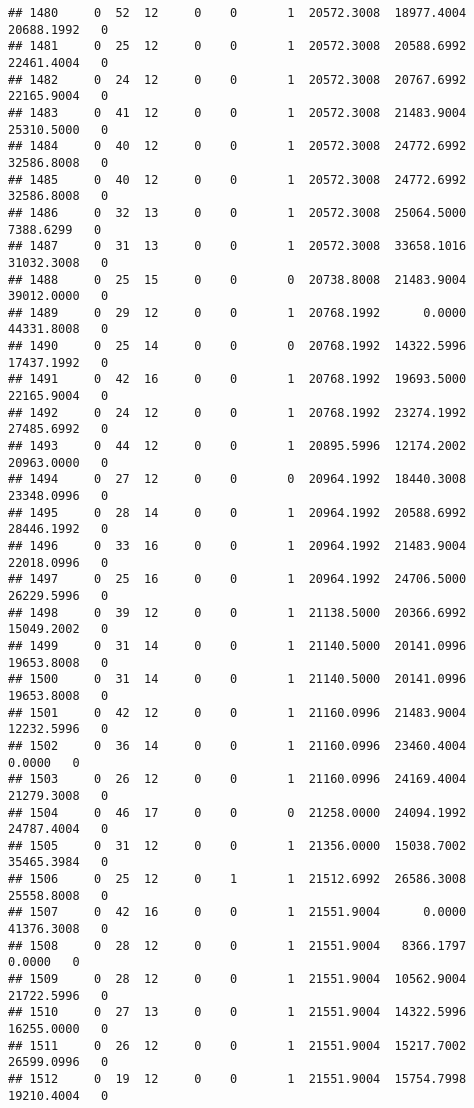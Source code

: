 \documentclass[
]{article}
\begin{document}
\begin{enumerate}
\begin{verbatim}
## 1480     0  52  12     0    0       1  20572.3008  18977.4004  20688.1992   0
## 1481     0  25  12     0    0       1  20572.3008  20588.6992  22461.4004   0
## 1482     0  24  12     0    0       1  20572.3008  20767.6992  22165.9004   0
## 1483     0  41  12     0    0       1  20572.3008  21483.9004  25310.5000   0
## 1484     0  40  12     0    0       1  20572.3008  24772.6992  32586.8008   0
## 1485     0  40  12     0    0       1  20572.3008  24772.6992  32586.8008   0
## 1486     0  32  13     0    0       1  20572.3008  25064.5000   7388.6299   0
## 1487     0  31  13     0    0       1  20572.3008  33658.1016  31032.3008   0
## 1488     0  25  15     0    0       0  20738.8008  21483.9004  39012.0000   0
## 1489     0  29  12     0    0       1  20768.1992      0.0000  44331.8008   0
## 1490     0  25  14     0    0       0  20768.1992  14322.5996  17437.1992   0
## 1491     0  42  16     0    0       1  20768.1992  19693.5000  22165.9004   0
## 1492     0  24  12     0    0       1  20768.1992  23274.1992  27485.6992   0
## 1493     0  44  12     0    0       1  20895.5996  12174.2002  20963.0000   0
## 1494     0  27  12     0    0       0  20964.1992  18440.3008  23348.0996   0
## 1495     0  28  14     0    0       1  20964.1992  20588.6992  28446.1992   0
## 1496     0  33  16     0    0       1  20964.1992  21483.9004  22018.0996   0
## 1497     0  25  16     0    0       1  20964.1992  24706.5000  26229.5996   0
## 1498     0  39  12     0    0       1  21138.5000  20366.6992  15049.2002   0
## 1499     0  31  14     0    0       1  21140.5000  20141.0996  19653.8008   0
## 1500     0  31  14     0    0       1  21140.5000  20141.0996  19653.8008   0
## 1501     0  42  12     0    0       1  21160.0996  21483.9004  12232.5996   0
## 1502     0  36  14     0    0       1  21160.0996  23460.4004      0.0000   0
## 1503     0  26  12     0    0       1  21160.0996  24169.4004  21279.3008   0
## 1504     0  46  17     0    0       0  21258.0000  24094.1992  24787.4004   0
## 1505     0  31  12     0    0       1  21356.0000  15038.7002  35465.3984   0
## 1506     0  25  12     0    1       1  21512.6992  26586.3008  25558.8008   0
## 1507     0  42  16     0    0       1  21551.9004      0.0000  41376.3008   0
## 1508     0  28  12     0    0       1  21551.9004   8366.1797      0.0000   0
## 1509     0  28  12     0    0       1  21551.9004  10562.9004  21722.5996   0
## 1510     0  27  13     0    0       1  21551.9004  14322.5996  16255.0000   0
## 1511     0  26  12     0    0       1  21551.9004  15217.7002  26599.0996   0
## 1512     0  19  12     0    0       1  21551.9004  15754.7998  19210.4004   0

\end{verbatim}
\end{enumerate}
\end{document}
